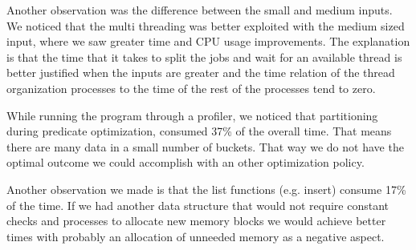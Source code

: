 \documentclass{ws-ijprai}
\begin{document}
\tab Another observation was the difference between the small and medium inputs. We noticed that the multi threading was better exploited with the medium sized input, where we saw greater time and CPU usage improvements. The explanation is that the time that it takes to split the jobs and wait for an available thread is better justified when the inputs are greater and the time relation of the thread organization processes to the time of the rest of the processes tend to zero.

\tab While running the program through a profiler, we noticed that partitioning during predicate optimization, consumed 37\% of the overall time. That means there are many data in a small number of buckets. That way we do not have the optimal outcome we could accomplish with an other optimization policy.

\tab Another observation we made is that the list functions (e.g. insert) consume 17\% of the time. If we had another data structure that would not require constant checks and processes to allocate new memory blocks we would achieve better times with probably an allocation of unneeded memory as a negative aspect.
\end{document}
